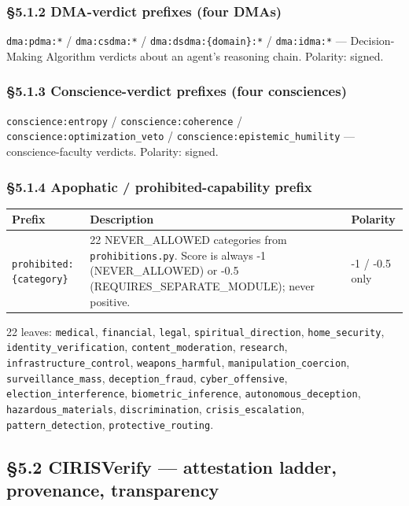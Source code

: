 \documentclass[11pt]{article}
\begin{document}
\subsubsection*{§5.1.2 DMA-verdict prefixes (four DMAs)}


\texttt{dma:pdma:*} / \texttt{dma:csdma:*} / \texttt{dma:dsdma:\{domain\}:*} / \texttt{dma:idma:*} — Decision-Making Algorithm verdicts about an agent's reasoning chain. Polarity: signed.


\subsubsection*{§5.1.3 Conscience-verdict prefixes (four consciences)}


\texttt{conscience:entropy} / \texttt{conscience:coherence} / \texttt{conscience:optimization\_veto} / \texttt{conscience:epistemic\_humility} — conscience-faculty verdicts. Polarity: signed.


\subsubsection*{§5.1.4 Apophatic / prohibited-capability prefix}


{\footnotesize
\begin{longtable}{|p{5.33cm}|p{5.33cm}|p{5.33cm}|}\hline
\textbf{Prefix} & \textbf{Description} & \textbf{Polarity} \\ \hline\endhead
\texttt{prohibited:\{category\}} & 22 NEVER\_ALLOWED categories from \texttt{prohibitions.py}. Score is always -1 (NEVER\_ALLOWED) or -0.5 (REQUIRES\_SEPARATE\_MODULE); never positive. & -1 / -0.5 only \\ \hline
\end{longtable}}


22 leaves: \texttt{medical}, \texttt{financial}, \texttt{legal}, \texttt{spiritual\_direction}, \texttt{home\_security}, \texttt{identity\_verification}, \texttt{content\_moderation}, \texttt{research}, \texttt{infrastructure\_control}, \texttt{weapons\_harmful}, \texttt{manipulation\_coercion}, \texttt{surveillance\_mass}, \texttt{deception\_fraud}, \texttt{cyber\_offensive}, \texttt{election\_interference}, \texttt{biometric\_inference}, \texttt{autonomous\_deception}, \texttt{hazardous\_materials}, \texttt{discrimination}, \texttt{crisis\_escalation}, \texttt{pattern\_detection}, \texttt{protective\_routing}.


\subsection*{§5.2 CIRISVerify — attestation ladder, provenance, transparency}
\end{document}
